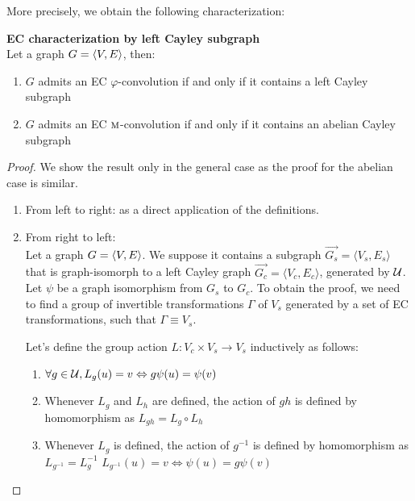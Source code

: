 More precisely, we obtain the following characterization:

\begin{theorem}\textbf{EC characterization by left Cayley subgraph}\\
Let a graph $G = \langle V, E \rangle$, then:
\begin{enumerate}[label=(\roman*)]
\item $G$ admits an EC $\varphi$-convolution if and only if it contains a left Cayley subgraph
\item $G$ admits an EC $\operatorname{\textsc{m}}$-convolution if and only if it contains an abelian Cayley subgraph
\end{enumerate}
\label{th:cayleychar}
\end{theorem}

\begin{proof}


We show the result only in the general case as the proof for the abelian case is similar.
\begin{enumerate}
	\item From left to right: as a direct application of the definitions.

	\item From right to left:\\
Let a graph $G = \langle V, E \rangle$. We suppose it contains a subgraph $\vec{G_s} = \langle V_s, E_s \rangle$ that is graph-isomorph to a left Cayley graph $\vec{G_c} = \langle V_c, E_c \rangle$, generated by $\mathcal{U}$. Let $\psi$ be a graph isomorphism from $G_s$ to $G_c$. To obtain the proof, we need to find a group of invertible transformations $\Gamma$ of $V_s$ generated by a set of EC transformations, such that $\Gamma \equiv V_s$.

Let's define the group action $L : V_c \times V_s \rightarrow V_s$ inductively as follows:
\begin{enumerate}[label=(\alph*)]
  \item $\forall g \in \mathcal{U}, L_g(u) = v \Leftrightarrow g\psi(u) = \psi(v)$ \label{enum:a}
  \item Whenever $L_g$ and $L_h$ are defined, the action of $gh$ is defined by homomorphism as $L_{gh}= L_g \circ L_h$ \label{enum:b}
  \item Whenever $L_g$ is defined, the action of $g^{-1}$ is defined by homomorphism as $L_{g^{-1}}=L_g^{-1}$ \ie $L_{g^{-1}}(u) = v \Leftrightarrow \psi(u) = g\psi(v)$ \label{enum:c}
\end{enumerate}


\end{enumerate}
\end{proof}
